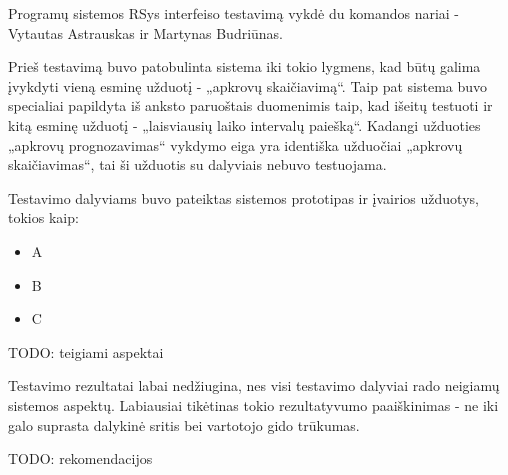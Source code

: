 Programų sistemos RSys interfeiso testavimą vykdė du komandos nariai -
Vytautas Astrauskas ir Martynas Budriūnas.

Prieš testavimą buvo patobulinta sistema iki tokio lygmens, kad būtų galima
įvykdyti vieną esminę užduotį - „apkrovų skaičiavimą“. Taip pat sistema
buvo specialiai papildyta iš anksto paruoštais duomenimis taip, kad išeitų testuoti
ir kitą esminę užduotį - „laisviausių laiko intervalų paiešką“. Kadangi
užduoties „apkrovų prognozavimas“ vykdymo eiga yra identiška užduočiai 
„apkrovų skaičiavimas“, tai ši užduotis su dalyviais nebuvo testuojama.

Testavimo dalyviams buvo pateiktas sistemos prototipas ir įvairios užduotys, 
tokios kaip:
\begin{itemize}
  \item A
  \item B
  \item C
\end{itemize}

TODO: teigiami aspektai

Testavimo rezultatai labai nedžiugina, nes visi testavimo dalyviai rado
neigiamų sistemos aspektų. Labiausiai tikėtinas tokio rezultatyvumo paaiškinimas - 
ne iki galo suprasta dalykinė sritis bei vartotojo gido trūkumas.

TODO: rekomendacijos
